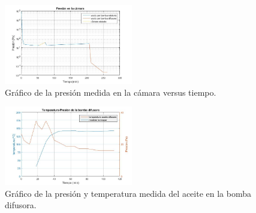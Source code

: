 \documentclass[journal]{IEEEtran}
\begin{document}
 
 \begin{figure}[H]
    \centering
    \includegraphics[width=0.5\textwidth]{Imagenes/graf1.jpg} 
    \caption{Gráfico de la presión medida en la cámara versus tiempo. }
    \label{grafico presion en la camara }
\end{figure}


\begin{table}[H]
\centering
{}
\caption{Medición de la presión y temperatura del aceite en la bomba difusora.}
\label{tabla temperatura y presion}
\end{table}
 
\begin{figure}[H]
    \centering
    \includegraphics[width=0.5\textwidth]{Imagenes/graf2.jpg}
    \caption{Gráfico de la presión y temperatura medida del aceite en la bomba difusora.}
    \label{grafico presion temperatura}
\end{figure}
 
\end{document}
